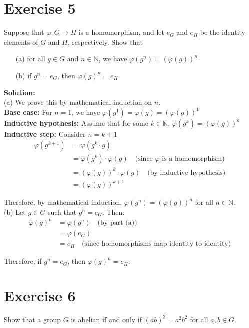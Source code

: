 \documentclass{article}
\begin{document}
\section*{Exercise 5}
Suppose that $\varphi: G \to H$ is a homomorphism, and let $e_G$ and $e_H$ be the identity elements of $G$ and $H$, respectively. Show that
\begin{itemize}
\item[(a)] for all $g \in G$ and $n \in \mathbb{N}$, we have $\varphi(g^n) = (\varphi(g))^n$
\item[(b)] if $g^n = e_G$, then $\varphi(g)^n = e_H$
\end{itemize}

\textbf{Solution:} \\

(a) We prove this by mathematical induction on $n$. \\

\textbf{Base case:} For $n = 1$, we have
$\varphi(g^1) = \varphi(g) = (\varphi(g))^1$ \\

\textbf{Inductive hypothesis:} Assume that for some $k \in \mathbb{N}$, 
$\varphi(g^k) = (\varphi(g))^k$ \\

\textbf{Inductive step:} Consider $n = k + 1$
\begin{align*}
\varphi(g^{k+1}) &= \varphi(g^k \cdot g) \\
&= \varphi(g^k) \cdot \varphi(g) \quad \text{(since $\varphi$ is a homomorphism)} \\
&= (\varphi(g))^k \cdot \varphi(g) \quad \text{(by inductive hypothesis)} \\
&= (\varphi(g))^{k+1}
\end{align*}

Therefore, by mathematical induction, $\varphi(g^n) = (\varphi(g))^n$ for all $n \in \mathbb{N}$. \\

(b) Let $g \in G$ such that $g^n = e_G$. Then:
\begin{align*}
\varphi(g)^n &= \varphi(g^n) \quad \text{(by part (a))} \\
&= \varphi(e_G) \\
&= e_H \quad \text{(since homomorphisms map identity to identity)}
\end{align*}

Therefore, if $g^n = e_G$, then $\varphi(g)^n = e_H$.
\newpage

\section*{Exercise 6}
Show that a group $G$ is abelian if and only if $(ab)^2 = a^2b^2$ for all $a,b \in G$. \\
\end{document}
